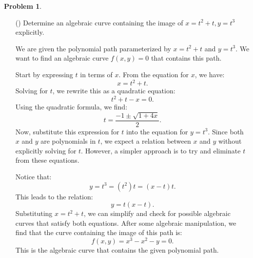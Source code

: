 \documentclass[12pt]{article}
\theoremstyle{definition}
\newtheorem{problem}{Problem}
\newcounter{subq}[problem]
\newenvironment{subproblem}
{\refstepcounter{subq} \begin{itemize} \item[(\alph{subq})]}
{\end{itemize} \medskip}
\begin{document}
\begin{problem}
    \begin{subproblem}
        Determine an algebraic curve containing the image of $x = t^2 + t, y = t^3$ explicitly.
        
        \begin{solution}
            We are given the polynomial path parameterized by $x = t^2 + t$ and $y = t^3$. We want to find an algebraic curve $f(x, y) = 0$ that contains this path.

            Start by expressing $t$ in terms of $x$. From the equation for $x$, we have:
            \[
            x = t^2 + t.
            \]
            Solving for $t$, we rewrite this as a quadratic equation:
            \[
            t^2 + t - x = 0.
            \]
            Using the quadratic formula, we find:
            \[
            t = \frac{-1 \pm \sqrt{1 + 4x}}{2}.
            \]
            Now, substitute this expression for $t$ into the equation for $y = t^3$. Since both $x$ and $y$ are polynomials in $t$, we expect a relation between $x$ and $y$ without explicitly solving for $t$. However, a simpler approach is to try and eliminate $t$ from these equations.
    
            Notice that:
            \[
            y = t^3 = (t^2) t = (x - t) t.
            \]
            This leads to the relation:
            \[
            y = t(x - t).
            \]
            Substituting $x = t^2 + t$, we can simplify and check for possible algebraic curves that satisfy both equations. After some algebraic manipulation, we find that the curve containing the image of this path is:
            \[
            f(x, y) = x^3 - x^2 - y = 0.
            \]
            This is the algebraic curve that contains the given polynomial path.      
        \end{solution}
    \end{subproblem}
\end{problem}
\end{document}
